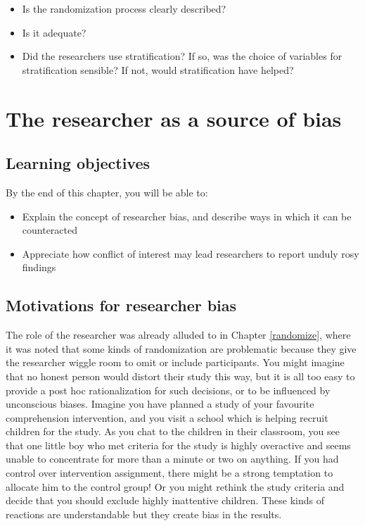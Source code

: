 \documentclass{krantz}
\begin{document}
\begin{itemize}
\item
  Is the randomization process clearly described?
\item
  Is it adequate?
\item
  Did the researchers use stratification? If so, was the choice of variables for stratification sensible? If not, would stratification have helped?
\end{itemize}

\hypertarget{experimenter}{%
\chapter{The researcher as a source of bias}\label{experimenter}}

\hypertarget{learning-objectives-7}{%
\section{Learning objectives}\label{learning-objectives-7}}

By the end of this chapter, you will be able to:

\begin{itemize}
\item
  Explain the concept of researcher bias, and describe ways in which it can be counteracted
\item
  Appreciate how conflict of interest may lead researchers to report unduly rosy findings
\end{itemize}

\hypertarget{motivations-for-researcher-bias}{%
\section{Motivations for researcher bias}\label{motivations-for-researcher-bias}}

The role of the researcher was already alluded to in Chapter \ref{randomize}, where it was noted that some kinds of randomization are problematic because they give the researcher wiggle room to omit or include participants. You might imagine that no honest person would distort their study this way, but it is all too easy to provide a post hoc rationalization for such decisions, or to be influenced by unconscious biases. Imagine you have planned a study of your favourite comprehension intervention, and you visit a school which is helping recruit children for the study. As you chat to the children in their classroom, you see that one little boy who met criteria for the study is highly overactive and seems unable to concentrate for more than a minute or two on anything. If you had control over intervention assignment, there might be a strong temptation to allocate him to the control group! Or you might rethink the study criteria and decide that you should exclude highly inattentive children. These kinds of reactions are understandable but they create bias in the results.
\end{document}
